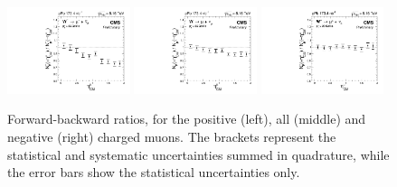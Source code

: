 \begin{figure}[htbp]
 \begin{center}
  \includegraphics[width=0.32\textwidth]{Figures/WBoson/Results/DATA/PA/ForwardBackward_Ratio/gr_WToMuMi_PA_ForwardBackward_Ratio_EffTnP_Nominal}
  \includegraphics[width=0.32\textwidth]{Figures/WBoson/Results/DATA/PA/ForwardBackward_Ratio/gr_WToMuInc_PA_ForwardBackward_Ratio_EffTnP_Nominal}
  \includegraphics[width=0.32\textwidth]{Figures/WBoson/Results/DATA/PA/ForwardBackward_Ratio/gr_WToMuPl_PA_ForwardBackward_Ratio_EffTnP_Nominal}
 \end{center}
 \caption{Forward-backward ratios, for the positive (left), all (middle) and negative (right) charged muons. The brackets represent the statistical and systematic uncertainties summed in quadrature, while the error bars show the statistical uncertainties only.}
 \label{fig:ForwardBackwardRatio_WToMu_PA}
\end{figure}


